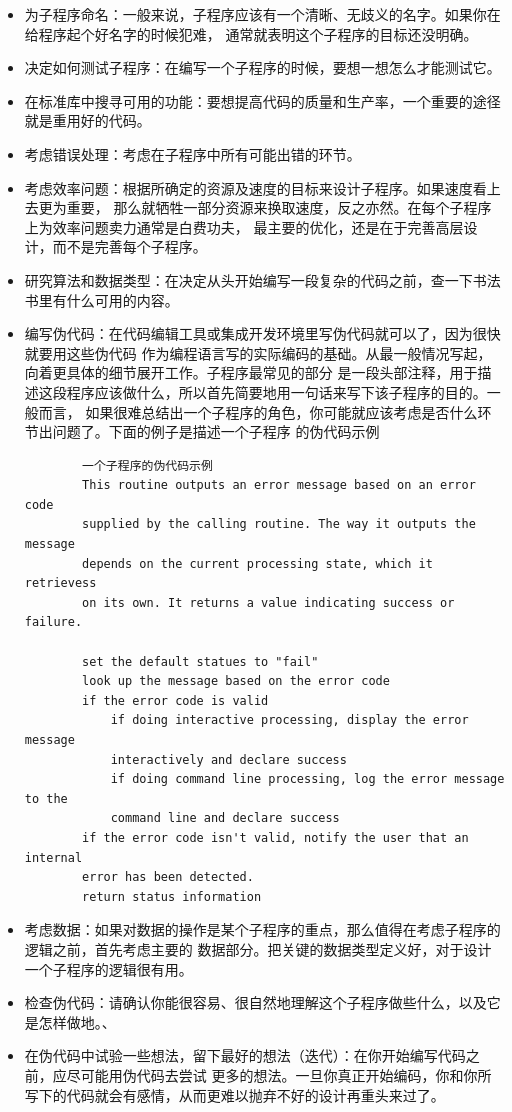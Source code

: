 \documentclass{article}
\begin{document}
\begin{itemize}
\begin{itemize}
    \end{itemize}
    \item 为子程序命名：一般来说，子程序应该有一个清晰、无歧义的名字。如果你在给程序起个好名字的时候犯难，
    通常就表明这个子程序的目标还没明确。
    \item 决定如何测试子程序：在编写一个子程序的时候，要想一想怎么才能测试它。
    \item 在标准库中搜寻可用的功能：要想提高代码的质量和生产率，一个重要的途径就是重用好的代码。
    \item 考虑错误处理：考虑在子程序中所有可能出错的环节。
    \item 考虑效率问题：根据所确定的资源及速度的目标来设计子程序。如果速度看上去更为重要，
    那么就牺牲一部分资源来换取速度，反之亦然。在每个子程序上为效率问题卖力通常是白费功夫，
    最主要的优化，还是在于完善高层设计，而不是完善每个子程序。
    \item 研究算法和数据类型：在决定从头开始编写一段复杂的代码之前，查一下书法书里有什么可用的内容。
    \item 编写伪代码：在代码编辑工具或集成开发环境里写伪代码就可以了，因为很快就要用这些伪代码
    作为编程语言写的实际编码的基础。从最一般情况写起，向着更具体的细节展开工作。子程序最常见的部分
    是一段头部注释，用于描述这段程序应该做什么，所以首先简要地用一句话来写下该子程序的目的。一般而言，
    如果很难总结出一个子程序的角色，你可能就应该考虑是否什么环节出问题了。下面的例子是描述一个子程序
    的伪代码示例
    \begin{lstlisting}
        一个子程序的伪代码示例
        This routine outputs an error message based on an error code 
        supplied by the calling routine. The way it outputs the message 
        depends on the current processing state, which it retrievess
        on its own. It returns a value indicating success or failure.

        set the default statues to "fail"
        look up the message based on the error code
        if the error code is valid
            if doing interactive processing, display the error message
            interactively and declare success
            if doing command line processing, log the error message to the 
            command line and declare success
        if the error code isn't valid, notify the user that an internal 
        error has been detected.
        return status information
    \end{lstlisting}
    \item 考虑数据：如果对数据的操作是某个子程序的重点，那么值得在考虑子程序的逻辑之前，首先考虑主要的
    数据部分。把关键的数据类型定义好，对于设计一个子程序的逻辑很有用。
    \item 检查伪代码：请确认你能很容易、很自然地理解这个子程序做些什么，以及它是怎样做地。、
    \item 在伪代码中试验一些想法，留下最好的想法（迭代）：在你开始编写代码之前，应尽可能用伪代码去尝试
    更多的想法。一旦你真正开始编码，你和你所写下的代码就会有感情，从而更难以抛弃不好的设计再重头来过了。
\end{itemize}
\end{document}
